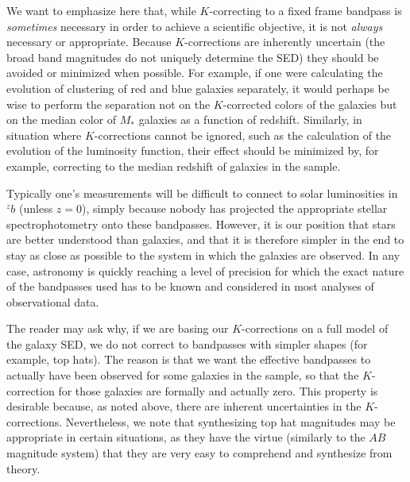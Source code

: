 \documentclass[10pt,preprint]{aastex}
\newcommand{\band}[2]{\ensuremath{^{#1}\!{#2}}}
\begin{document}
We want to emphasize here that, while $K$-correcting to a fixed frame
bandpass is {\it sometimes} necessary in order to achieve a scientific
objective, it is not {\it always} necessary or appropriate. Because
$K$-corrections are inherently uncertain (the broad band magnitudes
do not uniquely determine the SED) they should be avoided or
minimized when possible. For example, if one were calculating the
evolution of clustering of red and blue galaxies separately, it would
perhaps be wise to perform the separation not on the $K$-corrected
colors of the galaxies but on the median color of $M_\ast$
galaxies as a function of redshift. Similarly, in situation where
$K$-corrections cannot be ignored, such as the calculation of the
evolution of the luminosity function, their effect should be minimized
by, for example, correcting to the median redshift of galaxies in the
sample.

Typically one's measurements will be difficult to connect to solar
luminosities in $\band{z}{b}$ (unless $z=0$), simply because nobody
has projected the appropriate stellar spectrophotometry onto these
bandpasses. However, it is our position that stars are better
understood than galaxies, and that it is therefore simpler in the end
to stay as close as possible to the system in which the galaxies are
observed. In any case, astronomy is quickly reaching a level of
precision for which the exact nature of the bandpasses used has to be
known and considered in most analyses of observational data.

The reader may ask why, if we are basing our $K$-corrections on a full
model of the galaxy SED, we do not correct to bandpasses with simpler
shapes (for example, top hats). The reason is that we want the effective
bandpasses to actually have been observed for some galaxies in the
sample, so that the $K$-correction for those galaxies are formally and
actually zero. This property is desirable because, as noted above,
there are inherent uncertainties in the $K$-corrections. Nevertheless,
we note that synthesizing top hat magnitudes may be appropriate in
certain situations, as they have the virtue (similarly to the $AB$
magnitude system) that they are very easy to comprehend and synthesize
from theory.
\end{document}
